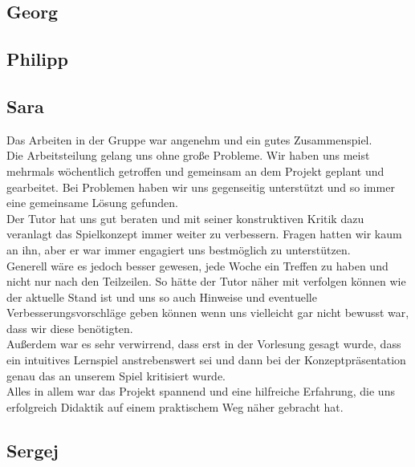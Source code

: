 \documentclass[10pt,a4paper,notitlepage]{report}
\begin{document}
	\subsection{Georg}

	\subsection{Philipp}
	
	\subsection{Sara}
	Das Arbeiten in der Gruppe war angenehm und ein gutes Zusammenspiel.\\
	Die Arbeitsteilung gelang uns ohne große Probleme. Wir haben uns meist mehrmals wöchentlich getroffen und gemeinsam an dem Projekt geplant und gearbeitet. Bei Problemen haben wir uns gegenseitig unterstützt und so immer eine gemeinsame Lösung gefunden.\\
	Der Tutor hat uns gut beraten und mit seiner konstruktiven Kritik dazu veranlagt das Spielkonzept immer weiter zu verbessern. Fragen hatten wir kaum an ihn, aber er war immer engagiert uns bestmöglich zu unterstützen.\\
	Generell wäre es jedoch besser gewesen, jede Woche ein Treffen zu haben und nicht nur nach den Teilzeilen. So hätte der Tutor näher mit verfolgen können wie der aktuelle Stand ist und uns so auch Hinweise und eventuelle Verbesserungsvorschläge geben können wenn uns vielleicht gar nicht bewusst war, dass wir diese benötigten.\\
	Außerdem war es sehr verwirrend, dass erst in der Vorlesung gesagt wurde, dass ein intuitives Lernspiel anstrebenswert sei und dann bei der Konzeptpräsentation genau das an unserem Spiel kritisiert wurde.\\
	Alles in allem war das Projekt spannend und eine hilfreiche Erfahrung, die uns erfolgreich Didaktik auf einem praktischem Weg näher gebracht hat.\\

	\subsection{Sergej}

	\Fusszeile
\end{document}
